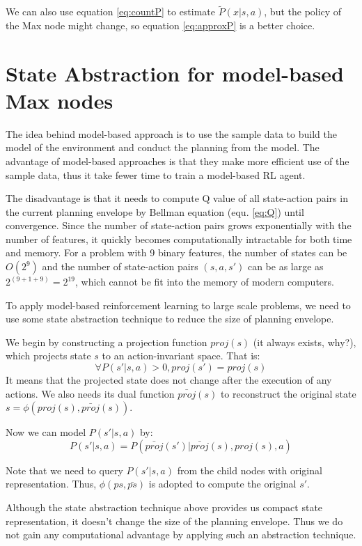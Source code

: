\documentclass{article} %
\begin{document}
We can also use equation \ref{eq:countP} to estimate $\tilde{P}(x|s, a)$, but the policy of the Max node
might change, so equation \ref{eq:approxP} is a better choice.

\section{State Abstraction for model-based Max nodes}
\label{se:Model}
The idea behind model-based approach is to use the sample data to build the model of the environment
and conduct the planning from the model.
The advantage of model-based approaches is that they make more efficient use of the sample data, thus 
it take fewer time to train a model-based RL agent.

The disadvantage is that it needs to compute Q value of all state-action pairs in the current 
planning envelope by Bellman equation (equ. \ref{eq:Q}) until convergence.
Since the number of state-action pairs grows exponentially with the number of features,
it quickly becomes computationally intractable for both time and memory.
For a problem with 9 binary features, the number of states can be $O(2^9)$ and the
number of state-action pairs $(s, a, s')$ can be as large as $2^(9+1+9)=2^19$, which cannot be fit into the
memory of modern computers.

To apply model-based reinforcement learning to large scale problems, 
we need to use some state abstraction technique to reduce the size of planning envelope.

We begin by constructing a projection function $proj(s)$ (it always exists, why?),
which projects state $s$ to an action-invariant space.
That is:
\begin{equation}
    \forall P(s'|s, a) > 0, proj(s') = proj(s)
\end{equation}
It means that the projected state does not change after the execution of 
any actions.
We also needs its dual function $\bar{proj}(s)$ to reconstruct 
the original state $s = \phi(proj(s), \bar{proj}(s))$.

Now we can model $P(s'|s, a)$ by:
\begin{equation}
    P(s'|s, a) = P(\bar{proj}(s')| \bar{proj}(s), proj(s), a)
\end{equation}

Note that we need to query $P(s'|s, a)$ from the child nodes with original representation.
Thus, $\phi(ps, \bar{ps})$ is adopted to compute the original $s'$.  

Although the state abstraction technique above provides us compact state representation, 
it doesn't change the size of the planning envelope. Thus we do not gain any computational
advantage by applying such an abstraction technique.
\end{document}
